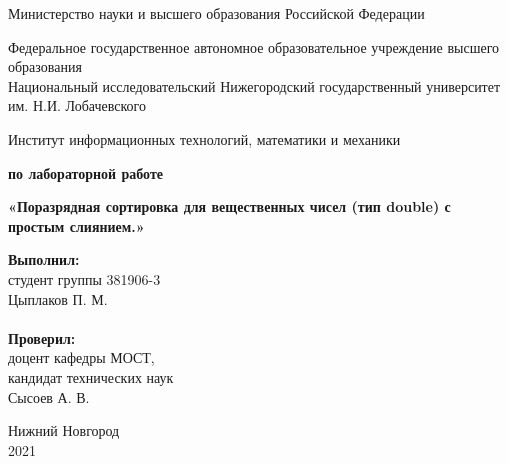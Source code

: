 \documentclass{report}
\begin{document}
\begin{titlepage}
\begin{center}
Министерство науки и высшего образования Российской Федерации
\end{center}
\begin{center}
Федеральное государственное автономное образовательное учреждение высшего образования \\
Национальный исследовательский Нижегородский государственный университет им. Н.И. Лобачевского
\end{center}
\begin{center}
Институт информационных технологий, математики и механики
\end{center}
\vspace{4em}
\begin{center}
\textbf{ по лабораторной работе} \\
\end{center}
\begin{center}
\textbf{\Large«Поразрядная сортировка для вещественных чисел (тип double) 
с простым слиянием.»} \\
\end{center}
\vspace{4em}
\newbox{\lbox}
\newlength{\maxl}
\setlength{\maxl}{\wd\lbox}
\hfill\parbox{7cm}{
\hspace*{5cm}\hspace*{-5cm}\textbf{Выполнил:} \\ студент группы 381906-3 \\ Цыплаков П. М. \\
\\
\hspace*{5cm}\hspace*{-5cm}\textbf{Проверил:}\\ доцент кафедры МОСТ, \\ кандидат технических наук \\ Сысоев А. В.\\
}
\vspace{\fill}
\begin{center} Нижний Новгород \\ 2021 \end{center}
\end{titlepage}
\setcounter{page}{2}
\tableofcontents
\newpage
\end{document}
